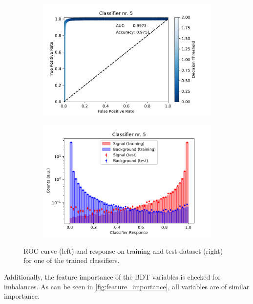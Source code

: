 \begin{figure}
  \centering
  \begin{subfigure}[b]{0.45\textwidth}
    \centering
    \includegraphics[width=\textwidth]{"content/plots/BDT/BDT_roc_auc4.pdf"}
    \label{fig:roc_curve}
  \end{subfigure}
  \hfill
  \begin{subfigure}[b]{0.45\textwidth}
    \centering
    \includegraphics[width=\textwidth]{"content/plots/BDT/BDT_train_test4.pdf"}
    \label{fig:train_test}
  \end{subfigure}
  \caption{ROC curve (left) and response on training and test dataset (right) for one of the trained classifiers.}
  \label{fig:BDT}
\end{figure}
Additionally, the feature importance of the BDT variables is checked for imbalances. As can be seen in \autoref{fig:feature_importance}, all variables are of similar importance.
